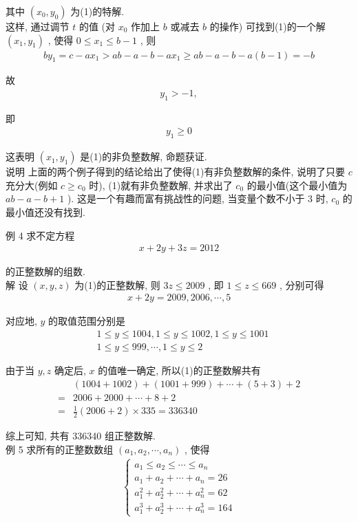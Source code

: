 	其中 $\left(x_{0}, y_{0}\right)$ 为(1)的特解.\\
	这样, 通过调节 $t$ 的值 (对 $x_{0}$ 作加上 $b$ 或减去 $b$ 的操作) 可找到(1)的一个解 $\left(x_{1}, y_{1}\right)$ , 使得 $0 \leqslant x_{1} \leqslant b-1$ , 则
\begin{align*}
		b y_{1}=c-a x_{1}>a b-a-b-a x_{1} \geqslant a b-a-b-a(b-1)=-b
	\end{align*}

	故
\begin{align*}
		y_{1}>-1,
	\end{align*}

	即
\begin{align*}
		y_{1} \geqslant 0
	\end{align*}

	这表明 $\left(x_{1}, y_{1}\right)$ 是(1)的非负整数解, 命题获证. \\
	说明 上面的两个例子得到的结论给出了使得(1)有非负整数解的条件, 说明了只要 $c$ 充分大(例如 $c \geqslant c_{0}$ 时), (1)就有非负整数解, 并求出了 $c_{0}$ 的最小值(这个最小值为 $a b-a-b+1$ ). 这是一个有趣而富有挑战性的问题, 当变量个数不小于 3 时, $c_{0}$ 的最小值还没有找到.

	例 4 求不定方程
\begin{align*}
		x+2 y+3 z=2012
	\end{align*}

	的正整数解的组数.\\
	解 设 $(x, y, z)$ 为(1)的正整数解, 则 $3 z \leqslant 2009$ , 即 $1 \leqslant z \leqslant 669$ , 分别可得
\begin{align*}
		x+2 y=2009,2006, \cdots, 5
	\end{align*}

	对应地, $y$ 的取值范围分别是\begin{align}
		 & 1 \leqslant y \leqslant 1004,1 \leqslant y \leqslant 1002,1 \leqslant y \leqslant 1001 \\
		 & 1 \leqslant y \leqslant 999, \cdots, 1 \leqslant y \leqslant 2
	\end{align}

	由于当 $y ,  z$ 确定后,  $x$ 的值唯一确定, 所以(1)的正整数解共有\begin{align}
		  & (1004+1002)+(1001+999)+\cdots+(5+3)+2 \\
		= & 2006+2000+\cdots+8+2                  \\
		= & \frac{1}{2}(2006+2) \times 335=336340
	\end{align}

	综上可知, 共有 336340 组正整数解. \\
	例 5 求所有的正整数数组 $\left(a_{1}, a_{2}, \cdots, a_{n}\right)$ , 使得
\begin{align*}
		\left\{\begin{array}{l}
			       a_{1} \leqslant a_{2} \leqslant \cdots \leqslant a_{n} \\
			       a_{1}+a_{2}+\cdots+a_{n}=26                            \\
			       a_{1}^{2}+a_{2}^{2}+\cdots+a_{n}^{2}=62                \\
			       a_{1}^{3}+a_{2}^{3}+\cdots+a_{n}^{3}=164
		       \end{array}\right.
	\end{align*}

